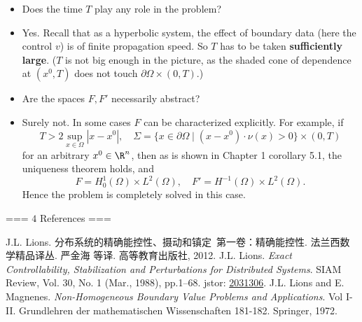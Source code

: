 \begin{itemize}
    \item[Q] Does the time $T$ play any role in the problem?
    \item[A] Yes. Recall that as a hyperbolic system, the effect of 
    boundary data (here the control $v$) is of finite propagation speed. 
    So $T$ has to be taken \textbf{sufficiently large}. 
    ($T$ is not big enough in the picture, as the shaded cone of dependence 
    at $(x^0,T)$ does not touch $\partial\Omega\times(0,T)$.)
    
    \item[Q] Are the spaces $F,F'$ necessarily abstract?
    \item[A] Surely not. In some cases $F$ can be characterized explicitly.
    For example, if 
    \[T>2\sup_{x\in\Omega}|x-x^0|,\quad 
    \Sigma=\{x\in\partial\Omega\mid(x-x^0)\cdot\nu(x)>0\}\times(0,T)\]
    for an arbitrary $x^0\in\R^n$, then as is shown 
    in \cite{L1} Chapter 1 corollary 5.1, the uniqueness theorem holds, and
    \[F=H_0^1(\Omega) \times L^2(\Omega),\quad
    F'=H^{-1}(\Omega) \times L^2(\Omega).\]
    Hence the problem is completely solved in this case.
\end{itemize}

=== $\boxed{4}$ References ===
\begin{references}
        J.L. Lions.
        分布系统的精确能控性、摄动和镇定\ 第一卷：精确能控性.
        法兰西数学精品译丛. 严金海 等译. 高等教育出版社, 2012.
        J.L. Lions. 
        \textit{Exact Controllability, Stabilization and Perturbations for Distributed Systems}. 
        SIAM Review, Vol. 30, No. 1 (Mar., 1988), pp.1--68. 
        jstor: \href{http://www.jstor.org/stable/2031306}{2031306}.
     J.L. Lions and E. Magnenes.
        \textit{Non-Homogeneous Boundary Value Problems and Applications}. 
        Vol I-II. Grundlehren der mathematischen Wissenschaften 181-182. 
        Springer, 1972.
\end{references}